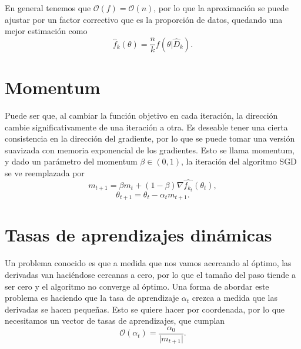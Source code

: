En general tenemos que \(\mathcal{O}(f) = \mathcal{O}(n)\), por lo que la aproximación se puede ajustar por un factor correctivo que es la proporción de datos, quedando una mejor estimación como \[\hat{f}_k(\theta) = \frac{n}{k}f(\theta\lvert \hat{D}_k).\]

\section{Momentum}

Puede ser que, al cambiar la función objetivo en cada iteración, la dirección cambie significativamente de una iteración a otra. Es deseable tener una cierta consistencia en la dirección del gradiente, por lo que se puede tomar una versión suavizada con memoria exponencial de los gradientes. Esto se llama momentum, y dado un parámetro del momentum \(\beta \in (0,1)\), la iteración del algoritmo SGD se ve reemplazada por
\[m_{t+1} = \beta m_t + (1-\beta) \nabla \hat{f_{k_t}}(\theta_t),\]
\[\theta_{t+1} = \theta_t - \alpha_t  m_{t+1}.\]

\section{Tasas de aprendizajes dinámicas}

Un problema conocido es que a medida que nos vamos acercando al óptimo, las derivadas van haciéndose cercanas a cero, por lo que el tamaño del paso tiende a ser cero y el algoritmo no converge al óptimo. Una forma de abordar este problema es haciendo que la tasa de aprendizaje \(\alpha_t\) crezca a medida que las derivadas se hacen pequeñas. Esto se quiere hacer por coordenada, por lo que necesitamos un vector de tasas de aprendizajes, que cumplan
\[\mathcal{O}(\alpha_{t}) = \frac{\alpha_0}{\lvert m_{t+1} \rvert}.\]